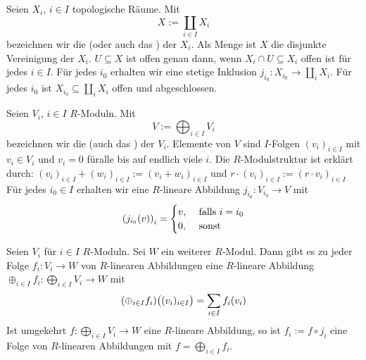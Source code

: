 \begin{definition}[{name=[Summe oder Koprodukt von topologischen Räumen]}]
	Seien $X_i$, $i \in I$ topologische Räume. Mit 
	\[
		X := \coprod_{i \in I} X_i 
	\]
	bezeichnen wir die  (oder auch das ) der $X_i$. 
	Als Menge ist $X$ die disjunkte Vereinigung der $X_i$. 
	$U \subseteq X$ ist offen genau dann, wenn $X_i \cap U \subseteq X_i$ offen ist für jedes $i \in I$. 
	Für jedes $i_0$ erhalten wir eine stetige Inklusion $j_{i_0} \colon X_{i_0} \to \coprod_{i} X_i$.
	Für jedes $i_0$ ist $X_{i_0} \subseteq \coprod_i X_i$ offen und abgeschlossen.
\end{definition}

\begin{definition}[{name=[{Summe von $R$-Moduln}]}]
	Seien $V_i$, $i \in I$ $R$-Moduln. Mit 
	\[
		V := \bigoplus_{i \in I} V_i
	\]
	bezeichnen wir die  (auch das ) der $V_i$. 
	Elemente von $V$ sind $I$-Folgen $(v_i)_{i \in I}$ mit $v_i \in V_i$ und $v_i=0$ füralle bis auf endlich viele $i$. 
	Die $R$-Modulstruktur ist erklärt durch: $(v_i)_{i \in I} + (w_i)_{i \in I} := (v_i +w_i)_{i \in I}$ und $r \cdot (v_i)_{i \in I} := (r \cdot v_i)_{i \in I}$
	Für jedes $i_0 \in I$ erhalten wir eine $R$-lineare Abbildung $j_{i_0} \colon V_{i_0} \to V$ mit
	\[
		\enbrace*{j_{i_0} (v)}_{i} = \begin{cases}
			v, &\text{ falls }i=i_0\\
			0 ,&\text{ sonst}
		\end{cases} 
	\]
\end{definition}

Seien $V_i$ für $i \in I$ $R$-Moduln. Sei $W$ ein weiterer $R$-Modul. Dann gibt es zu jeder Folge $f_i \colon V_i \to W$ von $R$-linearen Abbildungen eine
$R$-lineare Abbildung 
\(
	\oplus_{i \in I} f_i \colon \bigoplus_{i \in I} V_i \to W  
\)
mit
\[
	\enbrace*{\oplus_{i \in I} f_i} \enbrace[\big]{(v_i)_{i \in I}} = \sum_{i \in I} f_i(v_i)  
\]
Ist umgekehrt $f \colon \bigoplus_{i \in I} V_i \to W$ eine $R$-lineare Abbildung, so ist $f_i := f \circ j_{i}$ eine Folge von $R$-linearen Abbildungen mit 
$f = \bigoplus_{i \in I} f_i$.

